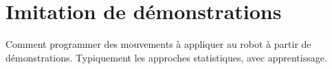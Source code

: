 \section{Imitation de d\'emonstrations}

Comment programmer des mouvements \`a appliquer au robot
\`a partir de d\'emonstrations. Typiquement les approches statistiques,
avec apprentissage.
